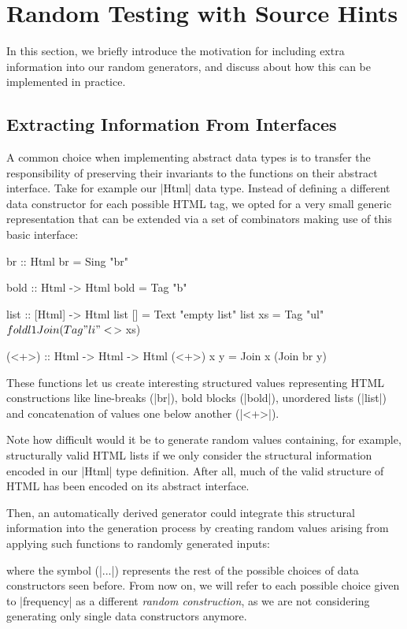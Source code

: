 \section{Random Testing with Source Hints}
\label{sec:sources}

In this section, we briefly introduce the motivation for including extra
information into our random generators, and discuss about how this can be
implemented in practice.


%
\subsection{Extracting Information From Interfaces}

A common choice when implementing abstract data types is to transfer the
responsibility of preserving their invariants to the functions on their abstract
interface.
%
Take for example our |Html| data type.
%
Instead of defining a different data constructor for each possible HTML tag, we
opted for a very small generic representation that can be extended via a set of
combinators making use of this basic interface:

\begin{code}
br :: Html
br = Sing "br"

bold :: Html -> Html
bold = Tag "b"

list :: [Html] -> Html
list []  = Text "empty list"
list xs  = Tag "ul" $ foldl1 Join (Tag "li" <$> xs)

(<+>) :: Html -> Html -> Html
(<+>) x y = Join x (Join br y)
\end{code} %
%
These functions let us create interesting structured values representing HTML
constructions like line-breaks (|br|), bold blocks (|bold|), unordered lists
(|list|) and concatenation of values one below another (|<+>|).

Note how difficult would it be to generate random values containing, for
example, structurally valid HTML lists if we only consider the structural
information encoded in our |Html| type definition.
%
After all, much of the valid structure of HTML has been encoded on its abstract
interface.


Then, an automatically derived generator could integrate this structural
information into the generation process by creating random values arising from
applying such functions to randomly generated inputs:

%
where the symbol (|...|) represents the rest of the possible choices of data
constructors seen before.
%
From now on, we will refer to each possible choice given to |frequency| as a
different \emph{random construction}, as we are not considering generating only
single data constructors anymore.

